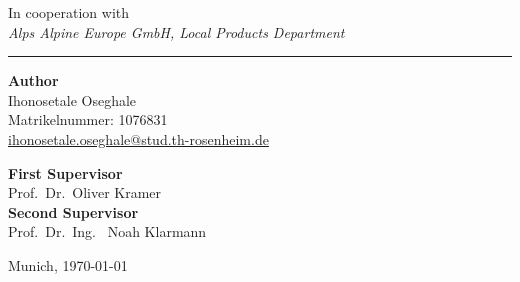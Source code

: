 \begin{titlepage}
    \vspace{1.2cm}
    \begin{center}
        {\normalsize In cooperation with}\\[0.2cm]
        {\normalsize\textit{Alps Alpine Europe GmbH, Local Products Department}}
    \end{center}

    \vfill  %

    \noindent\rule{\textwidth}{0.4pt}
    \vspace{0.6cm}

    \begin{minipage}[t]{0.48\textwidth}
        \raggedright
        {\small
        \textbf{Author}\\
        Ihonosetale Oseghale\\
        Matrikelnummer: 1076831\\
        \href{mailto:ihonosetale.oseghale@stud.th-rosenheim.de}
             {ihonosetale.oseghale@stud.th-rosenheim.de}
        }
    \end{minipage}
    \hfill
    \begin{minipage}[t]{0.48\textwidth}
        \raggedright
        {\small
        \textbf{First Supervisor}\\
        Prof.\ Dr.\ Oliver Kramer\\[0.5cm]
        \textbf{Second Supervisor}\\
         Prof.\ Dr.\ Ing. \ Noah Klarmann\\[0.5cm]
        }
    \end{minipage}

    \vspace{0.8cm}
    \begin{center}
        {\small Munich, \today}
    \end{center}

    \restoregeometry

\end{titlepage}